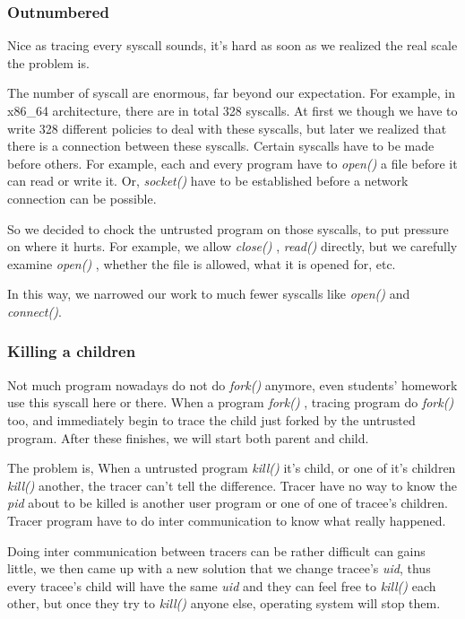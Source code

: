 \documentclass[conference,compsoc]{IEEEtran}
\begin{document}
		\subsubsection{Outnumbered}
			\par
				Nice as tracing every syscall sounds, it's hard as soon as we realized the real scale the problem is. 
			\par 
				The number of syscall are enormous, far beyond our expectation. 
				For example, in x86\_64 architecture, there are in total 328 syscalls. 
				At first we though we have to write 328 different policies to deal with these syscalls, but later we realized that there is a connection between these syscalls. 
				Certain syscalls have to be made before others. 
				For example, each and every program have to \emph{ open() } a file before it can read or write it. 
				Or, \emph{ socket() } have to be established before a network connection can be possible.
			\par
				So we decided to chock the untrusted program on those syscalls, to put pressure on where it hurts. 
				For example, we allow \emph{ close() }, \emph{ read() } directly, but we carefully examine \emph{ open() }, whether the file is allowed, what it is opened for, etc.
			\par 
				In this way, we narrowed our work to much fewer syscalls like \emph{open()} and \emph{connect()}.
		\subsubsection{Killing a children}
			\par 
				Not much program nowadays do not do \emph{ fork() } anymore, even students' homework use this syscall here or there. 
				When a program \emph{ fork() }, tracing program do \emph{ fork() } too, and immediately begin to trace the child just forked by the untrusted program. 
				After these finishes, we will start both parent and child.
			\par
				The problem is, When a untrusted program \emph{kill()} it's child, or one of it's children \emph{kill()} another, the tracer can't tell the difference. 
				Tracer have no way to know the \emph{pid} about to be killed is another user program or one of one of tracee's children. 
				Tracer program have to do inter communication to know what really happened.
			\par
				Doing inter communication between tracers can be rather difficult can gains little, we then came up with a new solution that we change tracee's \emph{uid}, thus every tracee's child will have the same \emph{uid} and they can feel free to \emph{kill()} each other, but once they try to \emph{kill()} anyone else, operating system will stop them.
\end{document}
